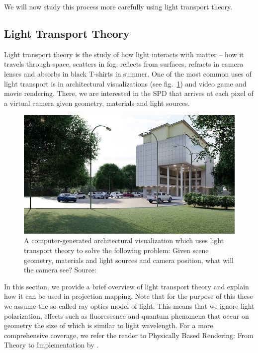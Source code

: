 We will now study this process more carefully using light transport theory.

\subsection{Light Transport Theory}
\label{section:background-projection_mapping-light_transport}

Light transport theory is the study of how light interacts with matter -- how it travels through space, scatters in fog, reflects from surfaces, refracts in camera lenses and absorbs in black T-shirts in summer. One of the most common uses of light transport is in architectural visualizations (see fig.~\ref{fig:background_light_transport_examples-rendering}) and video game and movie rendering. There, we are interested in the SPD that arrives at each pixel of a virtual camera given geometry, materials and light sources.

\begin{figure}
    \centering
    \includegraphics[width=\textwidth]{images/02-rendering.jpg}
    \caption{A computer-generated architectural visualization which uses light transport theory to solve the following problem: Given scene geometry, materials and light sources and camera position, what will the camera see? Source: \citet{ImageRendering}}
    \label{fig:background_light_transport_examples-rendering}
\end{figure}

In this section, we provide a brief overview of light transport theory and explain how it can be used in projection mapping. Note that for the purpose of this these we assume the so-called ray optics model of light. This means that we ignore light polarization, effects such as fluorescence and quantum phenomena that occur on geometry the size of which is similar to light wavelength. For a more comprehensive coverage, we refer the reader to Physically Based Rendering: From Theory to Implementation by \citet{PBRT3e}.

